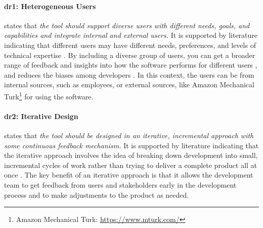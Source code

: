 
\paragraph{\ac{dr}1: Heterogeneous Users} states that \textit{the tool should support diverse users with different needs, goals, and capabilities and integrate internal and external users.} 
It is supported by literature indicating that different users may have different needs, preferences, and levels of technical expertise \cite{misc:lean:steve}.
By including a diverse group of users, you can get a broader range of feedback and insights into how the software performs for different users \cite{article:prototyping:weichbroth}, and reduces the biases among developers \cite{misc:lean:burmeister}.
In this context, the users can be from internal sources, such as employees, or external sources, like Amazon Mechanical Turk\footnote{Amazon Mechanical Turk: \url{https://www.mturk.com/}} for using the software.

\paragraph{\ac{dr}2: Iterative Design} states that \textit{the tool should be designed in an iterative, incremental approach with some continuous feedback mechanism.} 
It is supported by literature indicating that the iterative approach involves the idea of breaking down development into small, incremental cycles of work rather than trying to deliver a complete product all at once \cite{misc:lean:tutorial}.
The key benefit of an iterative approach is that it allows the development team to get feedback from users and stakeholders early in the development process and to make adjustments \cite{article:experiments:lindgren} to the product as needed.

